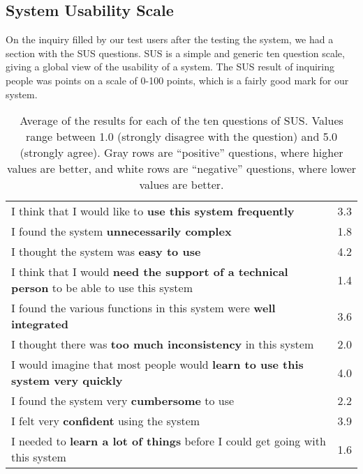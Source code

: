 \subsection{System Usability Scale}

On the inquiry filled by our test users after the testing the system, we had a section with the \acf{SUS} questions. \ac{SUS}\cite{Brooke:1996ua} is a simple and generic ten question scale, giving a global view of the usability of a system. The \ac{SUS} result of inquiring  people was  points on a scale of 0-100 points, which is a fairly good mark for our system.

\begin{table}[h]
	\renewcommand{\arraystretch}{1.5}
	\centering
\begin{tabular}{l|c}
I think that I would like to \textbf{use this system frequently} & 3.3\\
I found the system \textbf{unnecessarily complex} & 1.8\\
I thought the system was \textbf{easy to use} & 4.2\\
I think that I would \textbf{need the support of a technical person} to be able to use this system & 1.4\\
I found the various functions in this system were \textbf{well integrated} & 3.6\\
I thought there was \textbf{too much inconsistency} in this system & 2.0\\
I would imagine that most people would \textbf{learn to use this system very quickly} & 4.0\\
I found the system very \textbf{cumbersome} to use & 2.2\\
I felt very \textbf{confident} using the system & 3.9\\
I needed to \textbf{learn a lot of things} before I could get going with this system & 1.6\\
\end{tabular}
\caption[Average of the results for each of the ten questions of \ac{SUS}.]{Average of the results for each of the ten questions of \ac{SUS}. Values range between 1.0 (strongly disagree with the question) and 5.0 (strongly agree). Gray rows are ``positive'' questions, where higher values are better, and white rows are ``negative'' questions, where lower values are better.}
\label{tab:sus}
\vspace{\baselineskip}
\end{table}

